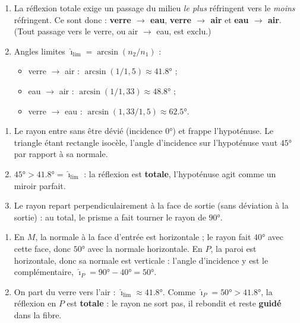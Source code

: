 \documentclass[11pt,a4paper]{article}
\begin{document}
\begin{corrige}
\begin{enumerate}[label=\alph*)]
  \item La réflexion totale exige un passage du milieu \emph{le plus} réfringent vers le \emph{moins}
        réfringent. Ce sont donc : \textbf{verre $\to$ eau}, \textbf{verre $\to$ air} et
        \textbf{eau $\to$ air}. (Tout passage vers le verre, ou air $\to$ eau, est exclu.)
  \item Angles limites $\hat{\imath}_{\text{lim}}=\arcsin(n_2/n_1)$ :
        \begin{itemize}[leftmargin=1.5em,topsep=1pt]
          \item verre $\to$ air : $\arcsin(1/1{,}5)\approx\ang{41.8}$ ;
          \item eau $\to$ air : $\arcsin(1/1{,}33)\approx\ang{48.8}$ ;
          \item verre $\to$ eau : $\arcsin(1{,}33/1{,}5)\approx\ang{62.5}$.
        \end{itemize}
\end{enumerate}
\end{corrige}

\begin{corrige}
\begin{enumerate}[label=\alph*)]
  \item Le rayon entre sans être dévié (incidence $\ang{0}$) et frappe l'hypoténuse. Le triangle étant
        rectangle isocèle, l'angle d'incidence sur l'hypoténuse vaut $\ang{45}$ par rapport à sa normale.
  \item $\ang{45}>\ang{41.8}=\hat{\imath}_{\text{lim}}$ : la réflexion est \textbf{totale}, l'hypoténuse
        agit comme un miroir parfait.
  \item Le rayon repart perpendiculairement à la face de sortie (sans déviation à la sortie) : au
        total, le prisme a fait tourner le rayon de $\boxed{\ang{90}}$.
\end{enumerate}
\end{corrige}

\begin{corrige}
\begin{enumerate}[label=\alph*)]
  \item En $M$, la normale à la face d'entrée est horizontale ; le rayon fait $\ang{40}$ avec cette
        face, donc $\ang{50}$ avec la normale horizontale. En $P$, la paroi est horizontale, donc sa
        normale est verticale : l'angle d'incidence y est le complémentaire,
        $\hat{\imath}_P=\ang{90}-\ang{40}=\ang{50}$.
  \item On part du verre vers l'air : $\hat{\imath}_{\text{lim}}\approx\ang{41.8}$. Comme
        $\hat{\imath}_P=\ang{50}>\ang{41.8}$, la réflexion en $P$ est \textbf{totale} : le rayon ne
        sort pas, il rebondit et reste \textbf{guidé} dans la fibre.
\end{enumerate}
\end{corrige}
\end{document}
